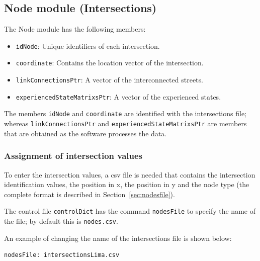 \documentclass[12pt,a4paper]{book}
\begin{document}
\subsection{Node module (Intersections)}
The Node module has the following members:
\begin{itemize}
  \item \texttt{idNode}: Unique identifiers of each intersection.
  \item \texttt{coordinate}: Contains the location vector of the intersection.
  \item \texttt{linkConnectionsPtr}: A vector of the interconnected streets.
  \item \texttt{experiencedStateMatrixsPtr}: A vector of the experienced states.
\end{itemize}
The members \texttt{idNode} and \texttt{coordinate} are identified with the intersections file;
whereas \texttt{linkConnectionsPtr} and \texttt{experiencedStateMatrixsPtr} are members that are
obtained as the software processes the data.

\subsubsection*{Assignment of intersection values}
To enter the intersection values, a csv file is needed that contains the intersection identification
values, the position in x, the position in y and the node type (the complete format is described in
Section~\ref{sec:nodesfile}).

The control file \texttt{controlDict} has the command \texttt{nodesFile} to specify the name of the
file; by default this is \texttt{nodes.csv}.

An example of changing the name of the intersections file is shown below:
\begin{lstlisting}[style=control]
nodesFile: intersectionsLima.csv
\end{lstlisting}
\end{document}
